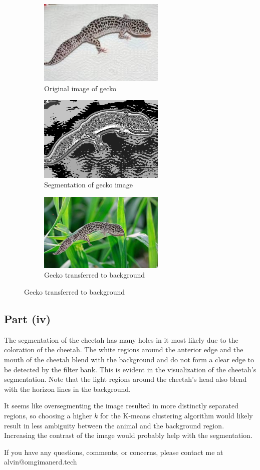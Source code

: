\documentclass{math}
\begin{document}
\begin{figure}[H]
  \begin{subfigure}{0.33\linewidth}
    \centering
    \includegraphics[width=6cm]{assets/hw_02_gecko.jpg}
    \caption{Original image of gecko}
  \end{subfigure}
  \begin{subfigure}{0.33\linewidth}
    \centering
    \includegraphics[width=6cm]{assets/hw_02_gecko_segmentation.png}
    \caption{Segmentation of gecko image}
  \end{subfigure}
  \begin{subfigure}{0.33\linewidth}
    \centering
    \includegraphics[width=6cm]{assets/hw_02_gecko_transposed.png}
    \caption{Gecko transferred to background}
  \end{subfigure}
\end{figure}

\subsection*{Part (iv)}
The segmentation of the cheetah has many holes in it most likely due to the
coloration of the cheetah. The white regions around the anterior edge and the
mouth of the cheetah blend with the background and do not form a clear edge
to be detected by the filter bank. This is evident in the visualization of the
cheetah's segmentation. Note that the light regions around the cheetah's head
also blend with the horizon lines in the background. \par
It seems like oversegmenting the image resulted in more distinctly separated
regions, so choosing a higher \( k \) for the K-means clustering algorithm
would likely result in less ambiguity between the animal and the background
region. Increasing the contrast of the image would probably help with the
segmentation.

\begin{center}
  If you have any questions, comments, or concerns, please contact me at
  alvin@omgimanerd.tech
\end{center}
\end{document}
